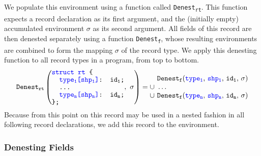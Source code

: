 We populate this environment using a function called \texttt{Denest\textsubscript{rt}}.
This function expects a record declaration as its first argument, and the (initially empty) accumulated environment $\sigma$ as its second argument.
All fields of this record are then denested separately using a function \texttt{Denest\textsubscript{f}}, whose resulting environments are combined to form the mapping $\sigma$ of the record type.
We apply this denesting function to all record types in a program, from top to bottom.
\[
    \texttt{Denest\textsubscript{rt}}\left(\vcenter{\ttfamily\setlength{\baselineskip}{1em}
        \hbox{{\color{blue}struct rt} \{}
        \hbox{\quad {\color{blue}type\textsubscript{1}[shp\textsubscript{1}]}: id\textsubscript{1};}
        \hbox{\quad \dots}
        \hbox{\quad {\color{blue}type\textsubscript{n}[shp\textsubscript{n}]}: id\textsubscript{n};}
        \hbox{\};}
    },\ \sigma\right)
    = \vcenter{
        \hbox{\quad \texttt{Denest\textsubscript{f}}(%
            \texttt{\color{blue}type\textsubscript{1}},\ 
            \texttt{\color{blue}shp\textsubscript{1}},\ 
            \texttt{id\textsubscript{1}},\ 
            \ensuremath{\sigma}%
        )}
        \hbox{\ensuremath{\cup}\, \dots}
        \hbox{\ensuremath{\cup} \texttt{Denest\textsubscript{f}}(%
            \texttt{\color{blue}type\textsubscript{n}},\ 
            \texttt{\color{blue}shp\textsubscript{n}},\ 
            \texttt{id\textsubscript{n}},\ 
            \ensuremath{\sigma}%
        )}
    }
\]
%
Because from this point on this record may be used in a nested fashion in all following record declarations, we add this record to the environment.


\subsubsection{Denesting Fields}

